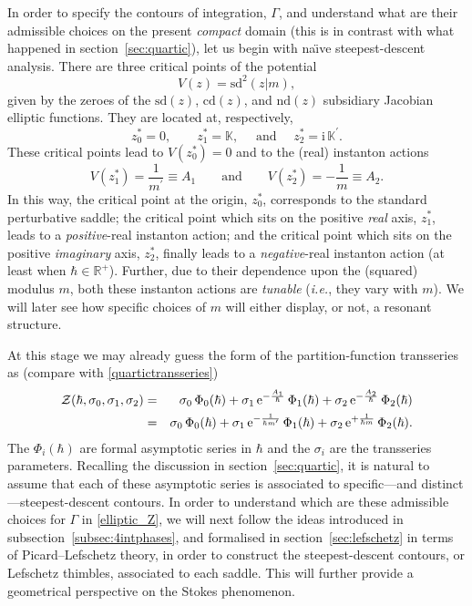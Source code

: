 \documentclass[11pt,a4paper]{article}
\newcommand{\CZ}{{\cal Z}}
\def\BR{{\mathbb R}}
\def\BK{{\mathbb K}}
\newcommand{\be}{\begin{equation}}
\newcommand{\ee}{\end{equation}}
\newcommand{\bea}{\begin{eqnarray}}
\newcommand{\eea}{\end{eqnarray}}
\newcommand{\rme}{{\mathrm{e}}}
\newcommand{\rmi}{{\mathrm{i}}}
\begin{document}
In order to specify the contours of integration, $\Gamma$, and understand what are their admissible choices on the present \textit{compact} domain (this is in contrast with what happened in section~\ref{sec:quartic}), let us begin with na\"\i ve steepest-descent analysis. There are three critical points of the potential
%
\be
\label{eq:ellipticsd2potential}
V(z) = \mathrm{sd}^2 ( z | m ),
\ee
%
\noindent
given by the zeroes of the $\mathrm{sd} (z)$, $\mathrm{cd} (z)$, and $\mathrm{nd} (z)$ subsidiary Jacobian elliptic functions. They are located at, respectively,
%
\be
z_0^* = 0, \qquad z_1^* = \BK, \quad \text{ and } \quad z_2^* = \rmi\, \BK^\prime.
\ee
%
\noindent
These critical points lead to $V(z^*_0) = 0$ and to the (real) instanton actions
%
\be
\label{eq:elliptic_critical}
V(z^*_1) = \frac{1}{m^\prime} \equiv A_1 \qquad \text{and} \qquad V(z^*_2) = - \frac{1}{m} \equiv A_2.
\ee
%
\noindent
In this way, the critical point at the origin, $z^*_0$, corresponds to the standard perturbative saddle; the critical point which sits on the positive \textit{real} axis, $z^*_1$, leads to a \textit{positive}-real instanton action; and the critical point which sits on the positive \textit{imaginary} axis, $z^*_2$, finally leads to a \textit{negative}-real instanton action (at least when $\hbar \in \BR^+$). Further, due to their dependence upon the (squared) modulus $m$, both these instanton actions are \textit{tunable} (\textit{i.e.}, they vary with $m$). We will later see how specific choices of $m$ will either display, or not, a resonant structure.

At this stage we may already guess the form of the partition-function transseries as (compare with \eqref{quartictransseries})
%
\bea
\CZ (\hbar, \sigma_{0}, \sigma_{1}, \sigma_{2}) &=&  \sigma_{0}\, \Phi_0 (\hbar) + \sigma_1\, \rme^{-\frac{A_1}{\hbar}}\, \Phi_1 (\hbar) + \sigma_2\, \rme^{-\frac{A_2}{\hbar}}\, \Phi_2 (\hbar) \\ 
&=& \sigma_0\, \Phi_0 (\hbar) + \sigma_1\, \rme^{-\frac{1}{\hbar m^\prime}}\, \Phi_1 (\hbar) + \sigma_2\, \rme^{+\frac{1}{\hbar m}}\, \Phi_2 (\hbar).
\label{ell_lin_transseries}
\eea
%
\noindent
The $\Phi_i (\hbar)$ are formal asymptotic series in $\hbar$ and the $\sigma_i$ are the transseries parameters. Recalling the discussion in section~\ref{sec:quartic}, it is natural to assume that each of these asymptotic series is associated to specific---and distinct---steepest-descent contours. In order to understand which are these admissible choices for $\Gamma$ in \eqref{elliptic_Z}, we will next follow the ideas introduced in subsection~\ref{subsec:4intphases}, and formalised in section~\ref{sec:lefschetz} in terms of Picard--Lefschetz theory, in order to construct the steepest-descent contours, or Lefschetz thimbles, associated to each saddle. This will further provide a geometrical perspective on the Stokes phenomenon.
\end{document}
